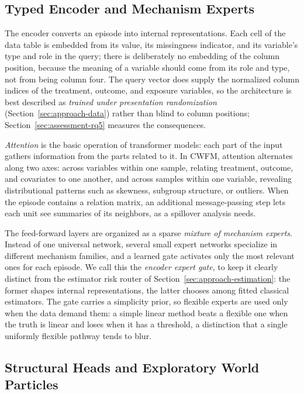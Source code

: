 \documentclass[electronics,article,submit,oneauthor]{Definitions/mdpi}
\begin{document}
\subsection{Typed Encoder and Mechanism Experts}\label{sec:approach-encoder}

The encoder converts an episode into internal representations. Each cell of the data table is embedded from its value, its missingness indicator, and its variable's type and role in the query; there is deliberately no embedding of the column position, because the meaning of a variable should come from its role and type, not from being column four. The query vector does supply the normalized column indices of the treatment, outcome, and exposure variables, so the architecture is best described as \emph{trained under presentation randomization} (Section~\ref{sec:approach-data}) rather than blind to column positions; Section~\ref{sec:assessment-rq5} measures the consequences.

\emph{Attention} is the basic operation of transformer models: each part of the input gathers information from the parts related to it. In CWFM, attention alternates along two axes: across variables within one sample, relating treatment, outcome, and covariates to one another, and across samples within one variable, revealing distributional patterns such as skewness, subgroup structure, or outliers. When the episode contains a relation matrix, an additional message-passing step lets each unit see summaries of its neighbors, as a spillover analysis needs.

The feed-forward layers are organized as a sparse \emph{mixture of mechanism experts}. Instead of one universal network, several small expert networks specialize in different mechanism families, and a learned gate activates only the most relevant ones for each episode. We call this the \emph{encoder expert gate}, to keep it clearly distinct from the estimator risk router of Section~\ref{sec:approach-estimation}: the former shapes internal representations, the latter chooses among fitted classical estimators. The gate carries a simplicity prior, so flexible experts are used only when the data demand them: a simple linear method beats a flexible one when the truth is linear and loses when it has a threshold, a distinction that a single uniformly flexible pathway tends to blur.


\subsection{Structural Heads and Exploratory World Particles}\label{sec:approach-worlds}
\end{document}
